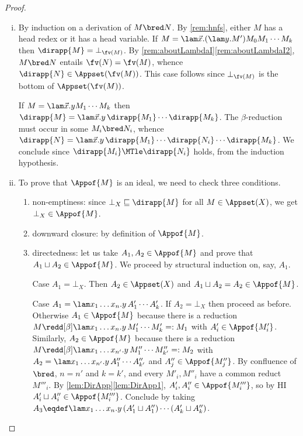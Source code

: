 \documentclass[10pt,a4paper]{amsart}
\theoremstyle{definition}
\newcommand{\bsub}{\begin{enumerate}[(i)]}
\newcommand{\esub}{\end{enumerate}}
\begin{document}
	\begin{proof}
	\bsub
	\item By induction on a derivation of $M\bred N$. By \cref{rem:hnfs}, 
		either $M$ has a head redex or it has a head variable.
		If $M = \lam \vec x.(\lam y.M')M_0M_1\cdots M_k$ then 
		$\dirapp{M} = \bot_{\fv(M)}$. 
		By \cref{rem:aboutLambdaI}\eqref{rem:aboutLambdaI2}, 
		$M\bred N$ entails $\fv(N) = \fv(M)$, 
		whence $\dirapp{N}\in\Appset(\fv(M))$.
		This case follows since $\bot_{\fv(M)}$ is the bottom of 
		$\Appset(\fv(M))$.
		
		If $M = \lam \vec x.yM_1\cdots M_k$ then $\dirapp{M} = \lam \vec 
		x.y\,\dirapp{M_1}\cdots \dirapp{M_k}$.
		The $\beta$-reduction must occur in some $M_i\bred N_i$, whence 
		$\dirapp{N} = \lam \vec x.y\,\dirapp{M_1}\cdots \dirapp{N_i}\cdots 
		\dirapp{M_k}$. We conclude since $\dirapp{M_i}\MTle\dirapp{N_i}$ 
		holds, from the induction hypothesis.
			
		\item To prove that $\Appof{M}$ is an ideal, we need to check three 
		conditions.
		\begin{enumerate}
		\item
			non-emptiness: since $\bot_{X}\sqsubseteq \dirapp{M}$ for all 
			$M\in\Appset(X)$, we get $\bot_{X} \in \Appof{M}$.
		\item
			downward closure: by definition of $\Appof{M}$.
		\item
			directedness: let us take $A_1,A_2\in\Appof{M}$ and prove that 
			$A_1\sqcup A_2\in\Appof{M}$.
			We proceed by structural induction on, say, $A_1$.
			
			Case $A_1 = \bot_X$. Then $A_2\in\Appset(X)$ and $A_1\sqcup A_2 
			= A_2\in\Appof{M}$.
			
			Case $A_1 = \lam x_1\ldots x_n.y\,A'_1\cdots A'_k$. If $A_2 = 
			\bot_X$ then proceed as before. Otherwise $A_1\in\Appof{M}$ 
			because there is a reduction $M\redd[\beta] \lam x_1\ldots 
			x_n.y\,M'_1\cdots M'_k=:M_1$ with $A'_i\in\Appof{M'_i}$.
			Similarly, $A_2\in\Appof{M}$ because there is a reduction 
			$M\redd[\beta] \lam x_1\ldots x_{n'}.y\,M''_1\cdots 
			M''_{k'}=:M_2$ with $A_2 = \lam x_1\ldots x_{n'}.y\,A''_1\cdots 
			A''_{k'} $ and $A''_j\in\Appof{M''_j}$.
			By confluence of $\bred$, $n = n'$ and $k = k'$, and every 
			$M'_i,M''_i$ have a common reduct $M'''_i$.
			By \cref{lem:DirApp}\eqref{lem:DirApp1}, 
			$A'_i,A''_i\in\Appof{M'''_i}$, so by HI $A'_i\sqcup 
			A''_i\in\Appof{M'''_i}$.
			Conclude by taking $A_3 \eqdef \lam x_1\ldots x_n.y\,(A'_1\sqcup 
			A''_1)\cdots (A'_k\sqcup A''_k)$.\qedhere
		\end{enumerate}
	\esub
	\end{proof}
\end{document}
